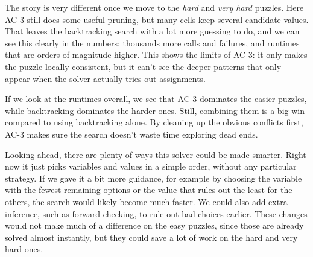 \documentclass[11pt]{article}
\begin{document}
The story is very different once we move to the \emph{hard} and \emph{very hard} puzzles.
Here AC-3 still does some useful pruning, but many cells keep several candidate values.
That leaves the backtracking search with a lot more guessing to do, and we can see this clearly in the numbers: thousands more calls and failures, and runtimes that are orders of magnitude higher.
This shows the limits of AC-3: it only makes the puzzle locally consistent, but it can’t see the deeper patterns that only appear when the solver actually tries out assignments.

If we look at the runtimes overall, we see that AC-3 dominates the easier puzzles, while backtracking dominates the harder ones.
Still, combining them is a big win compared to using backtracking alone.
By cleaning up the obvious conflicts first, AC-3 makes sure the search doesn’t waste time exploring dead ends.

Looking ahead, there are plenty of ways this solver could be made smarter.
Right now it just picks variables and values in a simple order, without any particular strategy.
If we gave it a bit more guidance, for example by choosing the variable with the fewest remaining options or the value that rules out the least for the others, the search would likely become much faster.
We could also add extra inference, such as forward checking, to rule out bad choices earlier.
These changes would not make much of a difference on the easy puzzles, since those are already solved almost instantly, but they could save a lot of work on the hard and very hard ones.
\end{document}
